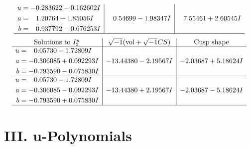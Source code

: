 \documentclass[1p]{elsarticle_modified}
\theoremstyle{definition}
\newcommand{\I}{\sqrt{-1}}
\begin{document}
$$\begin{array}{c|c|c}
\begin{aligned}
u &= -0.283622 - 0.162602 I \\
a &= \phantom{-}1.20764 + 1.85056 I \\
b &= \phantom{-}0.937792 - 0.676253 I\end{aligned}
 & \phantom{-}0.54699 - 1.98347 I & \phantom{-}7.55461 + 2.60545 I\\
 \hline 
 \end{array}$$\newpage$$\begin{array}{c|c|c}  
\text{Solutions to }I^u_{2}& \I (\text{vol} + \sqrt{-1}CS) & \text{Cusp shape}\\
 \hline 
\begin{aligned}
u &= \phantom{-}0.05730 + 1.72809 I \\
a &= -0.306085 + 0.092293 I \\
b &= -0.793590 - 0.075830 I\end{aligned}
 & -13.44380 - 2.19567 I & -2.03687 + 5.18624 I \\ \hline\begin{aligned}
u &= \phantom{-}0.05730 - 1.72809 I \\
a &= -0.306085 - 0.092293 I \\
b &= -0.793590 + 0.075830 I\end{aligned}
 & -13.44380 + 2.19567 I & -2.03687 - 5.18624 I\\
 \hline 
 \end{array}$$\newpage
\newpage\renewcommand{\arraystretch}{1}
\centering \section*{ III. u-Polynomials}
\end{document}

